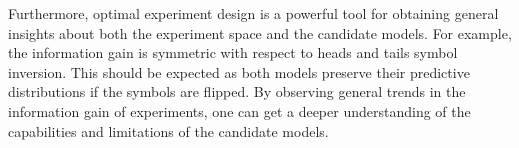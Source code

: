 \documentclass[11pt]{article}
\begin{document}
Furthermore, optimal experiment design is a powerful tool for obtaining general insights about both the experiment space and the candidate models. For example, the information gain is symmetric with respect to heads and tails symbol inversion. This should be expected as both models preserve their predictive distributions if the symbols are flipped. By observing general trends in the information gain of experiments, one can get a deeper understanding of the capabilities and limitations of the candidate models.

\end{document}
